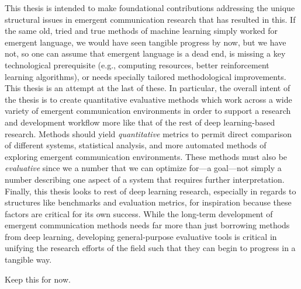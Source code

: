 This thesis is intended to make foundational contributions addressing the unique structural issues in emergent communication research that has resulted in this.
If the same old, tried and true methods of machine learning simply worked for emergent language, we would have seen tangible progress by now, but we have not, so one can assume that emergent language is a dead end, is missing a key technological prerequisite (e.g., computing resources, better reinforcement learning algorithms), or needs specially tailored methodological improvements.
This thesis is an attempt at the last of these.
In particular, the overall intent of the thesis is to create quantitative evaluative methods which work across a wide variety of emergent communication environments in order to support a research and development workflow more like that of the rest of deep learning-based research.
Methods should yield \emph{quantitative} metrics to permit direct comparison of different systems, statistical analysis, and more automated methods of exploring emergent communication environments.
These methods must also be \emph{evaluative} since we a number that we can optimize for---a goal---not simply a number describing one aspect of a system that requires further interpretation.
Finally, this thesis looks to rest of deep learning research, especially in regards to structures like benchmarks and evaluation metrics, for inspiration because these factors are critical for its own success.
While the long-term development of emergent communication methods needs far more than just borrowing methods from deep learning, developing general-purpose evaluative tools is critical in unifying the research efforts of the field such that they can begin to progress in a tangible way.

\iffalse Keep this for now.
